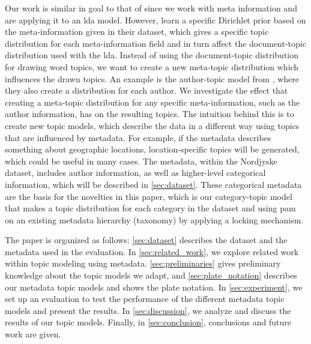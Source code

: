Our work is similar in goal to that of \citet{MetaLDA2017} since we work with meta information and are applying it to an \gls{lda} model.
However, \citet{MetaLDA2017} learn a specific Dirichlet prior based on the meta-information given in their dataset, which gives a specific topic distribution for each meta-information field and in turn affect the document-topic distribution used with the \gls{lda}.
Instead of using the document-topic distribution for drawing word topics, we want to create a new meta-topic distribution which influences the drawn topics.
An example is the author-topic model from \citet{author_topic_2012}, where they also create a distribution for each author.
We investigate the effect that creating a meta-topic distribution for any specific meta-information, such as the author information, has on the resulting topics.
The intuition behind this is to create new topic models, which describe the data in a different way using topics that are influenced by metadata.
For example, if the metadata describes something about geographic locations, location-specific topics will be generated, which could be useful in many cases.
The metadata, within the Nordjyske dataset, includes author information, as well as higher-level categorical information, which will be described in \autoref{sec:dataset}.
These categorical metadata are the basis for the novelties in this paper, which is our category-topic model that makes a topic distribution for each category in the dataset and using \gls{pam} on an existing metadata hierarchy (taxonomy) by applying a locking mechanism.

The paper is organized as follows:
\autoref{sec:dataset} describes the dataset and the metadata used in the evaluation.
In \autoref{sec:related_work}, we explore related work within topic modeling using metadata.
\autoref{sec:preliminaries} gives preliminary knowledge about the topic models we adapt, and \autoref{sec:plate_notation} describes our metadata topic models and shows the plate notation.
In \autoref{sec:experiment}, we set up an evaluation to test the performance of the different metadata topic models and present the results.
In \autoref{sec:discussion}, we analyze and discuss the results of our topic models.
Finally, in \autoref{sec:conclusion}, conclusions and future work are given.
